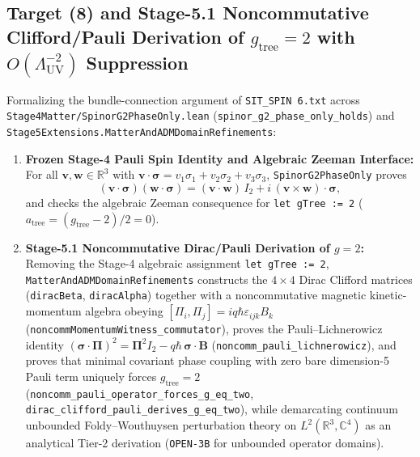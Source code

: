 \subsection{Target (8) and Stage-5.1 Noncommutative Clifford/Pauli Derivation of $g_{\mathrm{tree}} = 2$ with $O(\Lambda_{\mathrm{UV}}^{-2})$ Suppression}

Formalizing the bundle-connection argument of \texttt{SIT\_SPIN 6.txt} across \texttt{Stage4\allowbreak{}Matter/Spinor\allowbreak{}G2\allowbreak{}Phase\allowbreak{}Only.\allowbreak{}lean} (\texttt{spinor\_\allowbreak{}g2\_\allowbreak{}phase\_\allowbreak{}only\_\allowbreak{}holds}) and \texttt{Stage5\allowbreak{}Extensions.\allowbreak{}Matter\allowbreak{}And\allowbreak{}ADMDomain\allowbreak{}Refinements}:
\begin{enumerate}[leftmargin=2em]
  \item \textbf{Frozen Stage-4 Pauli Spin Identity and Algebraic Zeeman Interface:} For all $\mathbf{v}, \mathbf{w} \in \mathbb{R}^3$ with $\mathbf{v}\cdot\boldsymbol{\sigma} = v_1\sigma_1 + v_2\sigma_2 + v_3\sigma_3$, \texttt{SpinorG2PhaseOnly} proves
  \begin{equation}
  (\mathbf{v}\cdot\boldsymbol{\sigma})(\mathbf{w}\cdot\boldsymbol{\sigma})
  = (\mathbf{v}\cdot\mathbf{w})\,I_2 + i\,(\mathbf{v}\times\mathbf{w})\cdot\boldsymbol{\sigma},
  \label{eq:pauli_product_identity}
  \end{equation}
  and checks the algebraic Zeeman consequence for \texttt{let gTree := 2} ($a_{\mathrm{tree}} = (g_{\mathrm{tree}}-2)/2 = 0$).
  \item \textbf{Stage-5.1 Noncommutative Dirac/Pauli Derivation of $g = 2$:} Removing the Stage-4 algebraic assignment \texttt{let gTree := 2}, \texttt{Matter\allowbreak{}And\allowbreak{}ADMDomain\allowbreak{}Refinements} constructs the $4\times 4$ Dirac Clifford matrices (\texttt{diracBeta}, \texttt{diracAlpha}) together with a noncommutative magnetic kinetic-momentum algebra obeying $[\Pi_i, \Pi_j] = i q\hbar\varepsilon_{ijk}B_k$ (\texttt{noncomm\allowbreak{}Momentum\allowbreak{}Witness\_\allowbreak{}commutator}), proves the Pauli--Lichnerowicz identity $(\boldsymbol{\sigma}\cdot\boldsymbol{\Pi})^2 = \boldsymbol{\Pi}^2 I_2 - q\hbar\,\boldsymbol{\sigma}\cdot\mathbf{B}$ (\texttt{noncomm\_\allowbreak{}pauli\_\allowbreak{}lichnerowicz}), and proves that minimal covariant phase coupling with zero bare dimension-5 Pauli term uniquely forces $g_{\mathrm{tree}} = 2$ (\texttt{noncomm\_\allowbreak{}pauli\_\allowbreak{}operator\_\allowbreak{}forces\_\allowbreak{}g\_\allowbreak{}eq\_\allowbreak{}two}, \texttt{dirac\_\allowbreak{}clifford\_\allowbreak{}pauli\_\allowbreak{}derives\_\allowbreak{}g\_\allowbreak{}eq\_\allowbreak{}two}), while demarcating continuum unbounded Foldy--Wouthuysen perturbation theory on $L^2(\mathbb{R}^3,\mathbb{C}^4)$ as an analytical Tier-2 derivation (\texttt{OPEN-3B} for unbounded operator domains).

\end{enumerate}
